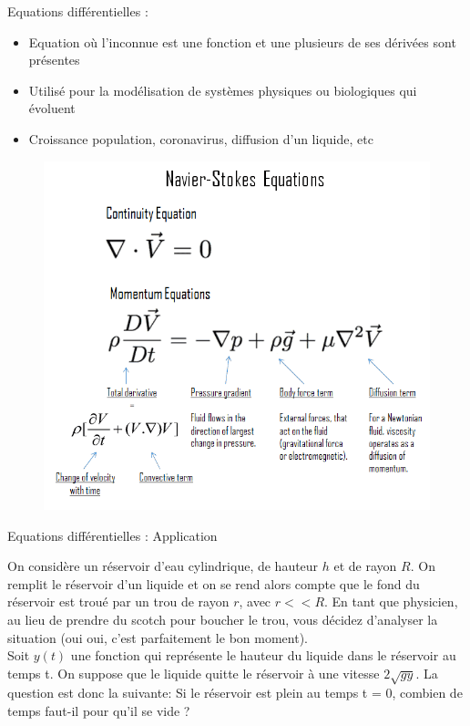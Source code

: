 \documentclass[xcolor=table]{beamer}
\begin{document}
\begin{frame}{Equations différentielles :}
\begin{itemize}
    
    \item  Equation où l'inconnue est une fonction et une plusieurs de ses dérivées sont présentes
    \item Utilisé pour la modélisation de systèmes physiques ou biologiques qui évoluent
    \item Croissance population, coronavirus, diffusion d'un liquide, etc
    \end{itemize}
    \begin{figure}
        \centering
        \includegraphics[scale = 0.2]{Images/Navier-Stokes-Equations-definition (1).png}
        \label{fig:lab}
    \end{figure}
    
\end{frame}
\begin{frame}{Equations différentielles : Application }
\begin{tcolorbox}[Title=Enoncé]
    On considère un réservoir d'eau cylindrique, de hauteur $h$ et de rayon $R$. On remplit le réservoir d'un liquide et on se rend alors compte que le fond du réservoir est troué par un trou de rayon $r$, avec $r << R$. En tant que physicien, au lieu de prendre du scotch pour boucher le trou, vous décidez d'analyser la situation (oui oui, c'est parfaitement le bon moment). \\
Soit $y(t)$ une fonction qui représente le hauteur du liquide dans le réservoir au temps t. On suppose que le liquide quitte le réservoir à une vitesse $2\sqrt{gy}$. La question est donc la suivante: Si le réservoir est plein au temps t = 0, combien de temps faut-il pour qu'il se vide ?
\end{tcolorbox}

    
\end{frame}
\end{document}
